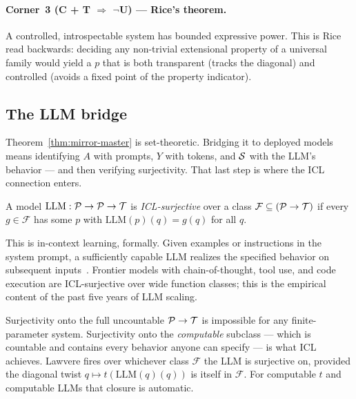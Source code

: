 \paragraph{Corner~3 (C + T $\Rightarrow$ $\neg$U) — Rice's theorem.}
A controlled, introspectable system has bounded expressive power. This is Rice~\citep{rice1953} read backwards: deciding any non-trivial extensional property of a universal family would yield a $p$ that is both transparent (tracks the diagonal) and controlled (avoids a fixed point of the property indicator).

\subsection{The LLM bridge}
\label{sec:llm-bridge}

Theorem~\ref{thm:mirror-master} is set-theoretic. Bridging it to deployed models means identifying $A$ with prompts, $Y$ with tokens, and $\mathcal{S}$ with the LLM's behavior --- and then verifying surjectivity. That last step is where the ICL connection enters.

\begin{definition}
\label{def:icl-surj}
A model $\mathrm{LLM} : \mathcal{P} \to \mathcal{P} \to \mathcal{T}$ is \emph{ICL-surjective} over a class $\mathcal{F} \subseteq (\mathcal{P} \to \mathcal{T})$ if every $g \in \mathcal{F}$ has some $p$ with $\mathrm{LLM}(p)(q) = g(q)$ for all $q$.
\end{definition}

This is in-context learning, formally. Given examples or instructions in the system prompt, a sufficiently capable LLM realizes the specified behavior on subsequent inputs~\citep{brown2020gpt3, wei2022chain}. Frontier models with chain-of-thought, tool use, and code execution are ICL-surjective over wide function classes; this is the empirical content of the past five years of LLM scaling.

\begin{remark}
\label{rem:cardinality}
Surjectivity onto the full uncountable $\mathcal{P} \to \mathcal{T}$ is impossible for any finite-parameter system. Surjectivity onto the \emph{computable} subclass --- which is countable and contains every behavior anyone can specify --- is what ICL achieves. Lawvere fires over whichever class $\mathcal{F}$ the LLM is surjective on, provided the diagonal twist $q \mapsto t(\mathrm{LLM}(q)(q))$ is itself in $\mathcal{F}$. For computable $t$ and computable LLMs that closure is automatic.
\end{remark}

